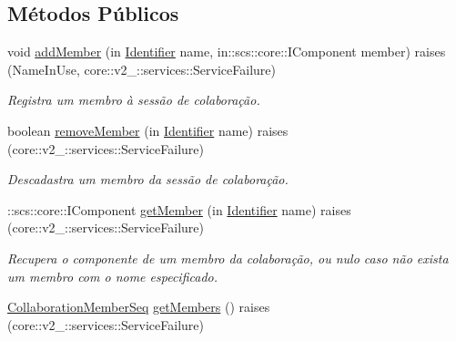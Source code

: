 \subsection*{\-Métodos \-Públicos}
\begin{DoxyCompactItemize}
\item 
void \hyperlink{interfacetecgraf_1_1openbus_1_1services_1_1collaboration_1_1v1__0_1_1CollaborationSession_a6cdb9d5a2df25627651c36f40ae4444d}{add\-Member} (in \hyperlink{namespacetecgraf_1_1openbus_1_1services_1_1collaboration_1_1v1__0_a75ab61291da492f86a7ea465804c7e45}{\-Identifier} name, in\-::scs\-::core\-::\-I\-Component member)  raises (\-Name\-In\-Use, core\-::v2\-\_\-::services\-::\-Service\-Failure)
\begin{DoxyCompactList}\small\item\em \-Registra um membro à sessão de colaboração. \end{DoxyCompactList}\item 
boolean \hyperlink{interfacetecgraf_1_1openbus_1_1services_1_1collaboration_1_1v1__0_1_1CollaborationSession_abb1545f4ff8562111126bb9fb6111c5f}{remove\-Member} (in \hyperlink{namespacetecgraf_1_1openbus_1_1services_1_1collaboration_1_1v1__0_a75ab61291da492f86a7ea465804c7e45}{\-Identifier} name)  raises (core\-::v2\-\_\-::services\-::\-Service\-Failure)
\begin{DoxyCompactList}\small\item\em \-Descadastra um membro da sessão de colaboração. \end{DoxyCompactList}\item 
\-::scs\-::core\-::\-I\-Component \hyperlink{interfacetecgraf_1_1openbus_1_1services_1_1collaboration_1_1v1__0_1_1CollaborationSession_a85f0ce27cf0f5c75928516a3d122e619}{get\-Member} (in \hyperlink{namespacetecgraf_1_1openbus_1_1services_1_1collaboration_1_1v1__0_a75ab61291da492f86a7ea465804c7e45}{\-Identifier} name)  raises (core\-::v2\-\_\-::services\-::\-Service\-Failure)
\begin{DoxyCompactList}\small\item\em \-Recupera o componente de um membro da colaboração, ou nulo caso não exista um membro com o nome especificado. \end{DoxyCompactList}\item 
\hyperlink{namespacetecgraf_1_1openbus_1_1services_1_1collaboration_1_1v1__0_ac42ccd44052fb5c923b4990ac5c76784}{\-Collaboration\-Member\-Seq} \hyperlink{interfacetecgraf_1_1openbus_1_1services_1_1collaboration_1_1v1__0_1_1CollaborationSession_aec6a25bab4f07afed4186ae6a0d8dc91}{get\-Members} ()  raises (core\-::v2\-\_\-::services\-::\-Service\-Failure)

\end{DoxyCompactItemize}
